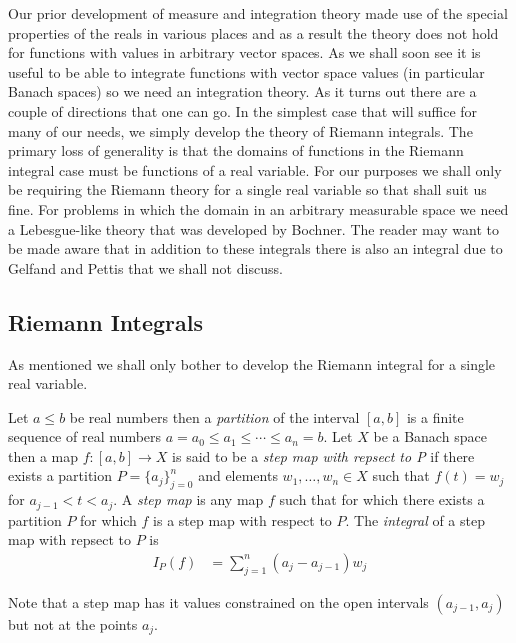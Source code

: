 Our prior development of measure and integration theory made use of the
special properties of the reals in various places and as a
result the theory does not hold for functions with values in arbitrary
vector spaces.  As we shall soon see it is useful to be able to
integrate functions with vector space values (in particular Banach
spaces) so we need an integration theory.  As it turns out there are a
couple of directions that one can go.  In the simplest case that will
suffice for many of our needs, we simply develop the theory of Riemann
integrals.  The primary loss of generality is
that the domains of functions in the Riemann integral case must be 
functions of a real variable.  For our purposes we shall only be
requiring the Riemann theory for a single real variable so that shall
suit us fine.  For problems in which the domain in an arbitrary
measurable space we need a Lebesgue-like theory that was developed by
Bochner.  The reader may want to be made aware that in addition to these integrals there is also an
integral due to Gelfand and Pettis that we shall not discuss.

\subsection{Riemann Integrals}
As mentioned we shall only bother to develop the Riemann integral for
a single real variable.
\begin{defn}Let $a \leq b$ be real numbers then a \emph{partition} of
  the interval $[a,b]$ is a finite sequence of real numbers $a=a_0
  \leq a_1 \leq \dotsb \leq a_n = b$.  Let $X$ be a Banach space then
  a map $f : [a,b] \to X$ is said to be a \emph{step map with repsect
    to P} if there
  exists a partition $P=\lbrace a_j \rbrace_{j=0}^n$ and elements $w_1,
  \dotsc, w_n \in X$ such that $f(t) = w_j$ for $a_{j-1} < t < a_j$.
  A \emph{step map} is any map $f$ such that for which there exists a partition
  $P$ for which $f$ is a step map with respect to $P$.
  The \emph{integral} of a step map with repsect to $P$ is
\begin{align*}
I_P(f) &= 
\sum_{j=1}^n (a_j - a_{j-1}) w_j
\end{align*}
\end{defn}
Note that a step map has it values constrained on the open intervals
$(a_{j-1},a_j)$ but not at the points $a_j$.

